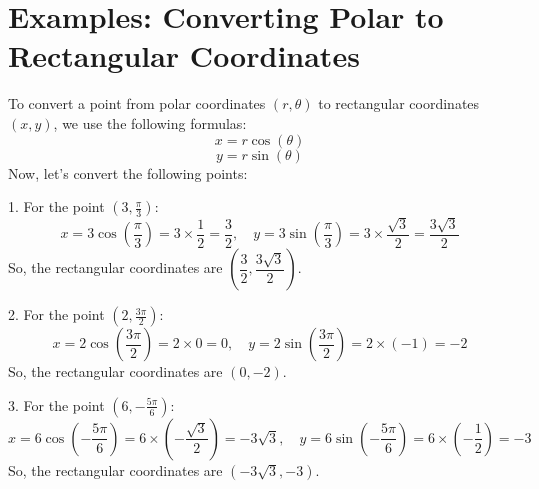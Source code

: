 \documentclass{article}
\begin{document}
    \section*{Examples: Converting Polar to Rectangular Coordinates}
    \begin{examplebox}
    To convert a point from polar coordinates $(r, \theta)$ to rectangular coordinates $(x, y)$, we use the following formulas:
    \[
    x = r \cos(\theta)
    \]
    \[
    y = r \sin(\theta)
    \]
    Now, let's convert the following points:
    \begin{exercisebox}
        1. For the point $(3, \frac{\pi}{3})$:
       \[
       x = 3 \cos\left( \frac{\pi}{3} \right) = 3 \times \frac{1}{2} = \frac{3}{2}, \quad y = 3 \sin\left( \frac{\pi}{3} \right) = 3 \times \frac{\sqrt{3}}{2} = \frac{3\sqrt{3}}{2}
       \]
       So, the rectangular coordinates are $\left( \dfrac{3}{2}, \dfrac{3\sqrt{3}}{2} \right)$.
    \end{exercisebox}
    
    \begin{exercisebox}
        2. For the point $(2, \frac{3\pi}{2})$:
       \[
       x = 2 \cos\left( \frac{3\pi}{2} \right) = 2 \times 0 = 0, \quad y = 2 \sin\left( \frac{3\pi}{2} \right) = 2 \times (-1) = -2
       \]
       So, the rectangular coordinates are $(0, -2)$.
    \end{exercisebox}
    
    \begin{exercisebox}
        3. For the point $(6, -\frac{5\pi}{6})$:
       \[
       x = 6 \cos\left( -\frac{5\pi}{6} \right) = 6 \times (-\frac{\sqrt{3}}{2}) = -3\sqrt{3}, \quad y = 6 \sin\left( -\frac{5\pi}{6} \right) = 6 \times (-\frac{1}{2}) = -3
       \]
       So, the rectangular coordinates are $(-3\sqrt{3}, -3)$.
    \end{exercisebox}
\end{examplebox}
\end{document}
